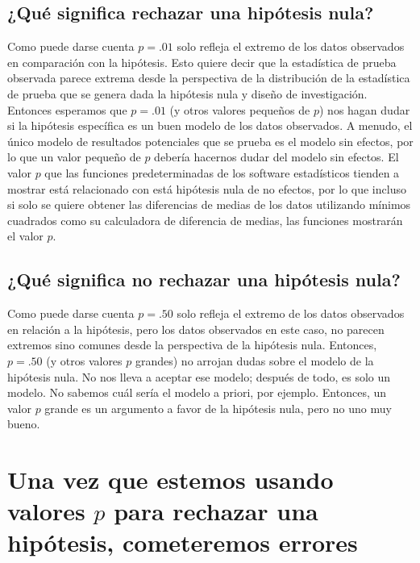 \documentclass[
]{article}
\begin{document}
\hypertarget{quuxe9-significa-rechazar-una-hipuxf3tesis-nula}{%
\subsection{¿Qué significa rechazar una hipótesis nula?}\label{quuxe9-significa-rechazar-una-hipuxf3tesis-nula}}

Como puede darse cuenta \(p = .01\) solo refleja el extremo de los datos observados en comparación con la hipótesis. Esto quiere decir que la estadística de prueba observada parece extrema desde la perspectiva de la distribución de la estadística de prueba que se genera dada la hipótesis nula y diseño de investigación. Entonces esperamos que \(p = .01\) (y otros valores pequeños de \(p\)) nos hagan dudar si la hipótesis específica es un buen modelo de los datos observados. A menudo, el único modelo de resultados potenciales que se prueba es el modelo sin efectos, por lo que un valor pequeño de \(p\) debería hacernos dudar del modelo sin efectos. El valor \(p\) que las funciones predeterminadas de los software estadísticos tienden a mostrar está relacionado con está hipótesis nula de no efectos, por lo que incluso si solo se quiere obtener las diferencias de medias de los datos utilizando mínimos cuadrados como su calculadora de diferencia de medias, las funciones mostrarán el valor \(p\).

\hypertarget{quuxe9-significa-no-rechazar-una-hipuxf3tesis-nula}{%
\subsection{\texorpdfstring{¿Qué significa \textbf{no rechazar} una hipótesis nula?}{¿Qué significa no rechazar una hipótesis nula?}}\label{quuxe9-significa-no-rechazar-una-hipuxf3tesis-nula}}

Como puede darse cuenta \(p = .50\) solo refleja el extremo de los datos observados en relación a la hipótesis, pero los datos observados en este caso, no parecen extremos sino comunes desde la perspectiva de la hipótesis nula. Entonces, \(p = .50\) (y otros valores \(p\) grandes) no arrojan dudas sobre el modelo de la hipótesis nula. No nos lleva a aceptar ese modelo; después de todo, es solo un modelo. No sabemos cuál sería el modelo a priori, por ejemplo. Entonces, un valor \(p\) grande es un argumento a favor de la hipótesis nula, pero no uno muy bueno.

\hypertarget{una-vez-que-estemos-usando-valores-p-para-rechazar-una-hipuxf3tesis-cometeremos-errores}{%
\section{\texorpdfstring{Una vez que estemos usando valores \(p\) para rechazar una hipótesis, cometeremos errores}{Una vez que estemos usando valores p para rechazar una hipótesis, cometeremos errores}}\label{una-vez-que-estemos-usando-valores-p-para-rechazar-una-hipuxf3tesis-cometeremos-errores}}
\end{document}
